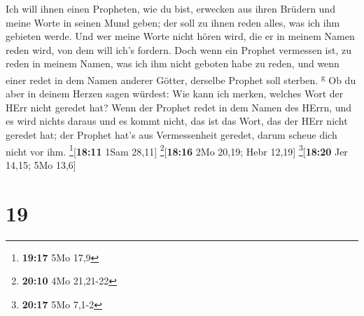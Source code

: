  Ich will ihnen einen Propheten, wie du bist, erwecken
aus ihren Brüdern und meine Worte in seinen Mund geben; der soll zu
ihnen reden alles, was ich ihm gebieten werde.  Und wer
meine Worte nicht hören wird, die er in meinem Namen reden wird, von dem
will ich's fordern.  Doch wenn ein Prophet vermessen ist,
zu reden in meinem Namen, was ich ihm nicht geboten habe zu reden, und
wenn einer redet in dem Namen anderer Götter, derselbe Prophet soll
sterben. \textsuperscript{g}  Ob du aber in deinem Herzen
sagen würdest: Wie kann ich merken, welches Wort der HErr nicht geredet
hat?  Wenn der Prophet redet in dem Namen des HErrn, und
es wird nichts daraus und es kommt nicht, das ist das Wort, das der HErr
nicht geredet hat; der Prophet hat's aus Vermessenheit geredet, darum
scheue dich nicht vor ihm. \footnote{\textbf{19:17} 5Mo 17,9}{[}\textbf{18:11}
1Sam 28,11{]} \footnote{\textbf{20:10} 4Mo 21,21-22}{[}\textbf{18:16}
2Mo 20,19; Hebr 12,19{]} \footnote{\textbf{20:17} 5Mo 7,1-2}{[}\textbf{18:20}
Jer 14,15; 5Mo 13,6{]}

\hypertarget{section-18}{%
\section{19}\label{section-18}}

